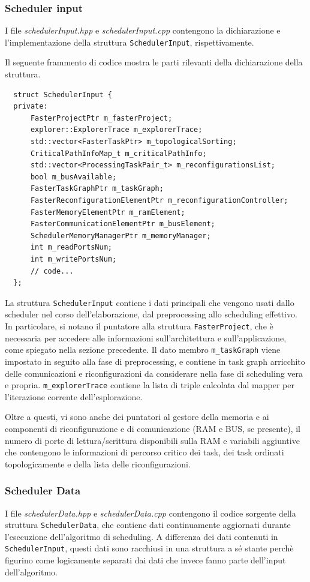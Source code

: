 \subsubsection{Scheduler input}
I file \emph{schedulerInput.hpp} e \emph{schedulerInput.cpp} contengono la 
dichiarazione e l'implementazione della struttura \verb+SchedulerInput+, 
rispettivamente.

Il seguente frammento di codice mostra le parti rilevanti della 
dichiarazione della struttura.
\newline
\begin{verbatim}
  struct SchedulerInput {
  private:
      FasterProjectPtr m_fasterProject;
      explorer::ExplorerTrace m_explorerTrace;
      std::vector<FasterTaskPtr> m_topologicalSorting;
      CriticalPathInfoMap_t m_criticalPathInfo;
      std::vector<ProcessingTaskPair_t> m_reconfigurationsList;
      bool m_busAvailable;
      FasterTaskGraphPtr m_taskGraph;
      FasterReconfigurationElementPtr m_reconfigurationController;
      FasterMemoryElementPtr m_ramElement;
      FasterCommunicationElementPtr m_busElement;
      SchedulerMemoryManagerPtr m_memoryManager;
      int m_readPortsNum;
      int m_writePortsNum;
      // code...
  };
\end{verbatim}
La struttura \verb+SchedulerInput+ contiene i dati principali che vengono usati 
dallo scheduler nel corso dell'elaborazione, dal preprocessing allo scheduling 
effettivo. In particolare, si notano il puntatore alla struttura 
\verb+FasterProject+, che è necessaria per accedere alle informazioni 
sull'architettura e sull'applicazione, come spiegato nella sezione precedente.
Il dato membro \verb+m_taskGraph+ viene impostato in seguito alla fase di 
preprocessing, e contiene in task graph arricchito delle comunicazioni e 
riconfigurazioni da considerare nella fase di scheduling vera e propria. 
\verb+m_explorerTrace+ contiene la lista di triple calcolata dal mapper per 
l'iterazione corrente dell'esplorazione.

Oltre a questi, vi sono anche dei puntatori al gestore della memoria e ai 
componenti di riconfigurazione e di comunicazione (\acs{RAM} e BUS, se 
presente), il numero di porte di lettura/scrittura disponibili sulla \acs{RAM} 
e variabili aggiuntive che contengono le informazioni di percorso critico dei 
task, dei task ordinati topologicamente e della lista delle riconfigurazioni.

\subsubsection{Scheduler Data}
I file \emph{schedulerData.hpp} e \emph{schedulerData.cpp} contengono il codice 
sorgente della struttura \verb+SchedulerData+, che contiene dati continuamente 
aggiornati durante l'esecuzione dell'algoritmo di scheduling. A differenza dei 
dati contenuti in \verb+SchedulerInput+, questi dati sono racchiusi in una 
struttura a sé stante perchè figurino come logicamente separati dai dati che 
invece fanno parte dell'input dell'algoritmo.


